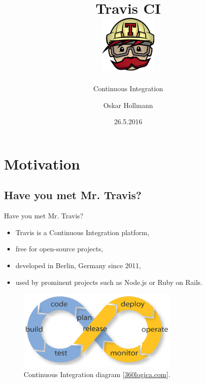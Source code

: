 \documentclass[xcolor=x11names,compress,t]{beamer}
\title{Travis CI\\\vspace{0.3em}\includegraphics[width=80pt]{./travis-logo.png}}
\subtitle{Continuous Integration}
\author[Oskar Hollmann]{Oskar Hollmann}
\institute{User Technologies}
\date{26.5.2016}
\renewcommand{\(}{\begin{columns}[T]}
\renewcommand{\)}{\end{columns}}
\newcommand{\<}[1]{\begin{column}{#1}}
\renewcommand{\>}{\end{column}}
\newenvironment{slide}[1]{\subsection{#1} \begin{frame}{#1}}{\end{frame}}
\begin{document}
\maketitle
{}

\section{Motivation}

\begin{slide}{Have you met Mr. Travis?}
\begin{itemize}
	\item Travis is a Continuous Integration platform,
    \item free for open-source projects,
    \item developed in Berlin, Germany since 2011,
    \item used by prominent projects such as Node.js or Ruby on Rails.
\end{itemize}
\begin{figure}[htb]
    \centering
    \includegraphics[width=0.7\textwidth]{ci}
    \caption{Continuous Integration diagram [\href{http://www.360logica.com/blog/2014/06/continuous-integration.html}{360logica.com}].}
\end{figure}
\end{slide}
\end{document}
